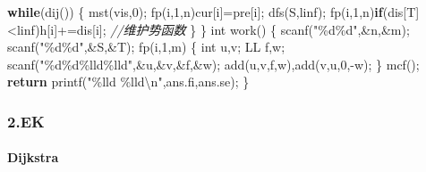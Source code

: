 \documentclass[
]{article}
\newenvironment{Shaded}{}{}
\newcommand{\CommentTok}[1]{\textcolor[rgb]{0.38,0.63,0.69}{\textit{#1}}}
\newcommand{\ControlFlowTok}[1]{\textcolor[rgb]{0.00,0.44,0.13}{\textbf{#1}}}
\newcommand{\DataTypeTok}[1]{\textcolor[rgb]{0.56,0.13,0.00}{#1}}
\newcommand{\DecValTok}[1]{\textcolor[rgb]{0.25,0.63,0.44}{#1}}
\newcommand{\NormalTok}[1]{#1}
\newcommand{\SpecialCharTok}[1]{\textcolor[rgb]{0.25,0.44,0.63}{#1}}
\newcommand{\StringTok}[1]{\textcolor[rgb]{0.25,0.44,0.63}{#1}}
\begin{document}
\begin{Shaded}
\begin{Highlighting}[]
    \ControlFlowTok{while}\NormalTok{(dij())}
\NormalTok{    \{}
\NormalTok{        mst(vis,}\DecValTok{0}\NormalTok{);}
\NormalTok{        fp(i,}\DecValTok{1}\NormalTok{,n)cur[i]=pre[i];   }
\NormalTok{        dfs(S,linf);}
\NormalTok{        fp(i,}\DecValTok{1}\NormalTok{,n)}\ControlFlowTok{if}\NormalTok{(dis[T]\textless{}linf)h[i]+=dis[i]; }\CommentTok{//维护势函数}
\NormalTok{    \}}
\NormalTok{\}}
\DataTypeTok{int}\NormalTok{ work()}
\NormalTok{\{}
\NormalTok{    scanf(}\StringTok{"}\SpecialCharTok{\%d\%d}\StringTok{"}\NormalTok{,\&n,\&m); }
\NormalTok{    scanf(}\StringTok{"}\SpecialCharTok{\%d\%d}\StringTok{"}\NormalTok{,\&S,\&T);}
\NormalTok{    fp(i,}\DecValTok{1}\NormalTok{,m)}
\NormalTok{    \{}
        \DataTypeTok{int}\NormalTok{ u,v; LL f,w;}
\NormalTok{        scanf(}\StringTok{"}\SpecialCharTok{\%d\%d\%lld\%lld}\StringTok{"}\NormalTok{,\&u,\&v,\&f,\&w);}
\NormalTok{        add(u,v,f,w),add(v,u,}\DecValTok{0}\NormalTok{,{-}w);}
\NormalTok{    \}}
\NormalTok{    mcf();}
    \ControlFlowTok{return}\NormalTok{ printf(}\StringTok{"}\SpecialCharTok{\%lld}\StringTok{ }\SpecialCharTok{\%lld\textbackslash{}n}\StringTok{"}\NormalTok{,ans.fi,ans.se);}
\NormalTok{\}}
\end{Highlighting}
\end{Shaded}

\hypertarget{ek}{%
\subsubsection{2.EK}\label{ek}}

\hypertarget{dijkstra-1}{%
\paragraph{Dijkstra}\label{dijkstra-1}}
\end{document}
